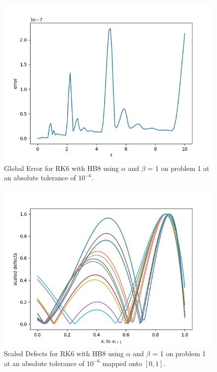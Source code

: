 \begin{figure}[H]
\centering
\includegraphics[width=0.7\linewidth]{./figures/static_alpha_rk6_with_hb8_p1_global_error}
\caption{Global Error for RK6 with HB8 using $\alpha$ and $\beta$ = 1 on problem 1 at an absolute tolerance of $10^{-6}$.}
\label{fig:static_alpha_rk6_with_hb8_p1_global_error}
\end{figure}

\begin{figure}[H]
\centering
\includegraphics[width=0.7\linewidth]{./figures/static_alpha_rk6_with_hb8_p1_scaled_defects}
\caption{Scaled Defects for RK6 with HB8 using $\alpha$ and $\beta$ = 1 on problem 1 at an absolute tolerance of $10^{-6}$ mapped onto $[0, 1]$.}
\label{fig:static_alpha_rk6_with_hb8_p1_scaled_defects}
\end{figure}

